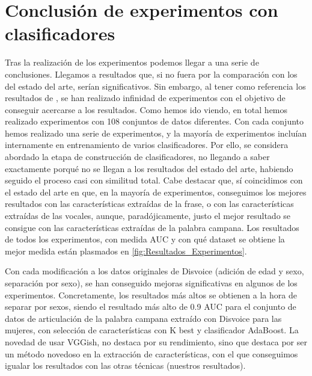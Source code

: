 \section{Conclusión de experimentos con clasificadores} \label{sec:resultados}
Tras la realización de los experimentos podemos llegar a una serie de conclusiones.
Llegamos a resultados que, si no fuera por la comparación con los del estado del arte, serían significativos. Sin embargo, al tener como referencia los resultados de \cite{Orz2016}, se han realizado infinidad de experimentos con el objetivo de conseguir acercarse a los resultados. Como hemos ido viendo, en total hemos realizado experimentos con 108 conjuntos de datos diferentes. Con cada conjunto hemos realizado una serie de experimentos, y la mayoría de experimentos incluían internamente en entrenamiento de varios clasificadores. Por ello, se considera abordado la etapa de construcción de clasificadores, no llegando a saber exactamente porqué no se llegan a los resultados del estado del arte, habiendo seguido el proceso casi con similitud total. Cabe destacar que, sí coincidimos con el estado del arte en que, en la mayoría de experimentos, conseguimos los mejores resultados con las características extraídas de la frase, o con las características extraídas de las vocales, aunque, paradójicamente, justo el mejor resultado se consigue con las características extraídas de la palabra campana. Los resultados de todos los experimentos, con medida AUC y con qué dataset se obtiene la mejor medida están plasmados en \ref{fig:Resultados_Experimentos}.

Con cada modificación a los datos originales de Disvoice (adición de edad y sexo, separación por sexo), se han conseguido mejoras significativas en algunos de los experimentos. Concretamente, los resultados más altos se obtienen a la hora de separar por sexos, siendo el resultado más alto de 0.9 AUC para el conjunto de datos de articulación de la palabra campana extraído con Disvoice para las mujeres, con selección de características con K best y clasificador AdaBoost.
La novedad de usar VGGish, no destaca por su rendimiento, sino que destaca por ser un método novedoso en la extracción de características, con el que conseguimos igualar los resultados con las otras técnicas (nuestros resultados). 

